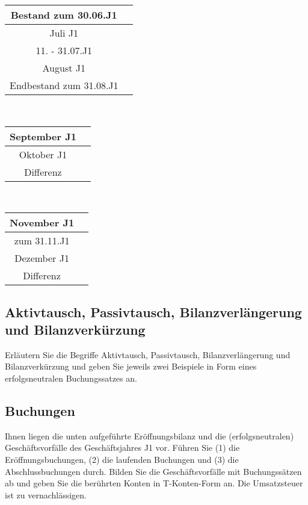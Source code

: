 \documentclass[paper=a4, fontsize=11pt]{scrartcl}
\numberwithin{equation}{section}
\numberwithin{figure}{section}
\numberwithin{table}{section}
\begin{document}
\begin{tabular}{c|c}
\hline
Bestand zum 30.06.J1 & \\
\hline
Juli J1 & \\
\hline
11. - 31.07.J1 & \\
\hline
August J1 & \\
\hline
Endbestand zum 31.08.J1 & \\
\hline
\end{tabular}
\\

\begin{tabular}{c|c}
\hline
September J1 & \\
\hline
Oktober J1 & \\
\hline
Differenz & \\
\hline
\end{tabular}
\\

\begin{tabular}{c|c}
\hline
November J1 & \\
\hline
zum 31.11.J1 & \\
\hline
Dezember J1 & \\
\hline
Differenz & \\
\hline
\end{tabular}

\subsection{Aktivtausch, Passivtausch, Bilanzverlängerung und Bilanzverkürzung}
Erläutern Sie die Begriffe Aktivtausch, Passivtausch, Bilanzverlängerung und Bilanzverkürzung und geben Sie jeweils zwei Beispiele in Form eines erfolgsneutralen Buchungssatzes an. \\
\subsection{Buchungen}
Ihnen liegen die unten aufgeführte Eröffnungsbilanz und die (erfolgsneutralen) Geschäftsvorfälle des Geschäftsjahres J1 vor. Führen Sie (1) die Eröffnungsbuchungen, (2) die laufenden Buchungen und (3) die Abschlussbuchungen durch. Bilden Sie die Geschäftsvorfälle mit Buchungssätzen ab und geben Sie die berührten Konten in T-Konten-Form an. Die Umsatzsteuer ist zu vernachlässigen. \\
\end{document}
